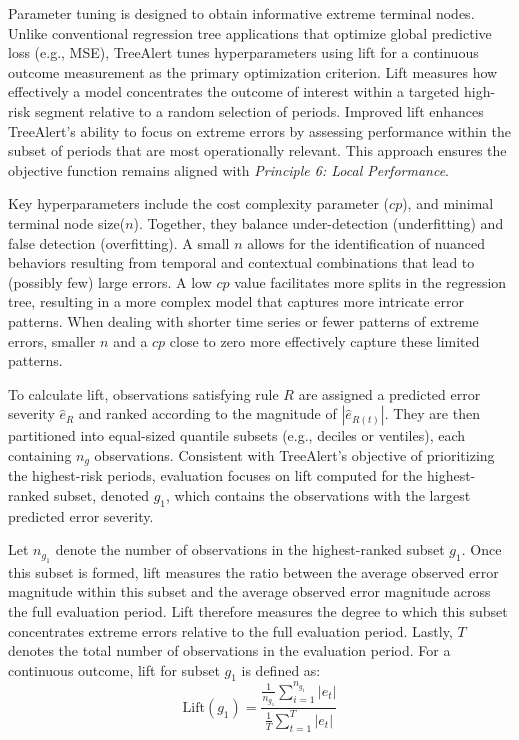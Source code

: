 \documentclass[preprint,12pt]{elsarticle}
\begin{document}
Parameter tuning is designed to obtain informative extreme terminal nodes. Unlike conventional regression tree applications that optimize global predictive loss (e.g., MSE), TreeAlert tunes hyperparameters using lift for a continuous outcome measurement as the primary optimization criterion. Lift measures how effectively a model concentrates the outcome of interest within a targeted high-risk segment relative to a random selection of periods. Improved lift enhances TreeAlert's ability to focus on extreme errors by assessing performance within the subset of periods that are most operationally relevant. This approach ensures the objective function remains aligned with \emph{Principle 6: Local Performance}.

Key hyperparameters include the cost complexity parameter ($cp$), and minimal terminal node size($n$). Together, they balance under-detection (underfitting) and false detection (overfitting). A small $n$ allows for the identification of nuanced behaviors resulting from temporal and contextual combinations that lead to (possibly few) large errors. A low $cp$ value facilitates more splits in the regression tree, resulting in a more complex model that captures more intricate error patterns. When dealing with shorter time series or fewer patterns of extreme errors, smaller $n$ and a $cp$ close to zero  more effectively capture these limited patterns.

To calculate lift, observations satisfying rule \( R \) are assigned a predicted error severity \( \hat{e}_{R} \) and ranked according to the magnitude of \( |\hat{e}_{R(t)}| \). They are then partitioned into equal-sized quantile subsets (e.g., deciles or ventiles), each containing \( n_g \) observations. Consistent with TreeAlert’s objective of prioritizing the highest-risk periods, evaluation focuses on lift computed for the highest-ranked subset, denoted \( g_{1} \), which contains the observations with the largest predicted error severity. 

Let \( n_{g_1} \) denote the number of observations in the highest-ranked subset \( g_{1} \). Once this subset is formed, lift measures the ratio between the average observed error magnitude within this subset and the average observed error magnitude across the full evaluation period. Lift therefore measures the degree to which this subset concentrates extreme errors relative to the full evaluation period. Lastly, \( T \) denotes the total number of observations in the evaluation period. For a continuous outcome, lift for subset \( g_{1} \) is defined as:
\begin{equation}
\text{Lift}(g_{1}) =
\frac{
\displaystyle \frac{1}{n_{g_1}}\sum_{i=1}^{n_{g_1}} |e_t|
}{
\displaystyle \frac{1}{T}\sum_{t=1}^{T} |e_t|
}
\end{equation}
\end{document}

